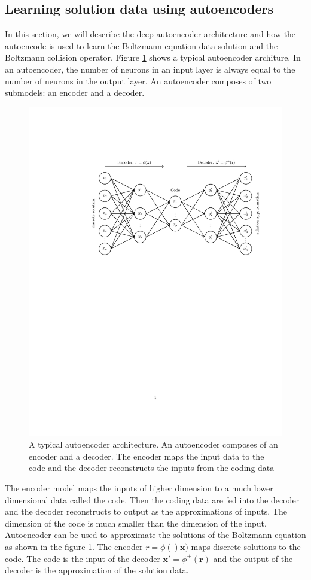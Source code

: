 \documentclass{article}
\begin{document}
\subsection{Learning solution data using autoencoders}
In this section, we will describe the deep autoencoder architecture and how the autoencode is used to learn the Boltzmann equation data solution and the Boltzmann collision operator. Figure \ref{fig:ae} shows a typical autoencoder architure. In an autoencoder, the number of neurons in an input layer is always equal to the number of neurons in the output layer. An autoencoder composes of two submodels: an encoder and a decoder.
\begin{figure}
\centering
\includegraphics[width=1.0\textwidth]{Autoencoder.pdf}
\caption{A typical autoencoder architecture. An autoencoder composes of an encoder and a decoder. The encoder maps the input data to the code and the decoder reconstructs the inputs from the coding data}
\label{fig:ae}
\end{figure} 
The encoder model maps the inputs of higher dimension to a much lower dimensional data called the code. Then the coding data are fed into the decoder and the decoder reconstructs to output as the approximations of  inputs. The dimension of the code is much smaller than the dimension of the input. Autoencoder can be used to approximate the solutions of the Boltzmann equation as shown in the figure \ref{fig:ae}. The encoder $r = \phi()\mathbf{x})$ maps discrete solutions to the code. The code is the input of the decoder $\mathbf{x'}=\phi^+(\mathbf{r})$ and the output of the decoder is the approximation of the solution data.
\end{document}
